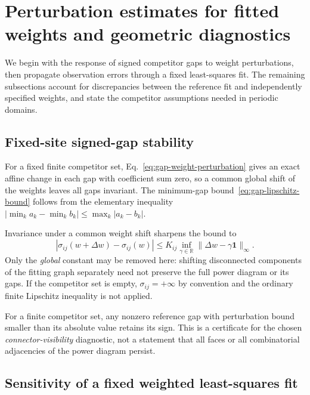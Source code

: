 \section{Perturbation estimates for fitted weights and geometric diagnostics}
\label{app:stability-details}

We begin with the response of signed competitor gaps to weight perturbations, then propagate observation errors through a fixed least-squares fit. The remaining subsections account for discrepancies between the reference fit and independently specified weights, and state the competitor assumptions needed in periodic domains.


\subsection{Fixed-site signed-gap stability}
\label{app:stability-slack}

For a fixed finite competitor set, Eq.~\eqref{eq:gap-weight-perturbation} gives an exact affine change in each gap with coefficient sum zero, so a common global shift of the weights leaves all gaps invariant. The minimum-gap bound~\eqref{eq:gap-lipschitz-bound} follows from the elementary inequality $|\min_k a_k-\min_k b_k|\le\max_k|a_k-b_k|$.

Invariance under a common weight shift sharpens the bound to
\begin{equation}
|\sigma_{ij}(w+\Delta w)-\sigma_{ij}(w)|
\le K_{ij}\inf_{\gamma\in\mathbb R}
\|\Delta w-\gamma\mathbf1\|_\infty.
\label{eq:gap-gauge-invariant-lipschitz}
\end{equation}
Only the \emph{global} constant may be removed here: shifting disconnected components of the fitting graph separately need not preserve the full power diagram or its gaps. If the competitor set is empty, $\sigma_{ij}=+\infty$ by convention and the ordinary finite Lipschitz inequality is not applied.

For a finite competitor set, any nonzero reference gap with perturbation bound smaller than its absolute value retains its sign. This is a certificate for the chosen \emph{connector-visibility} diagnostic, not a statement that all faces or all combinatorial adjacencies of the power diagram persist.

\subsection{Sensitivity of a fixed weighted least-squares fit}
\label{app:stability-estimator}

